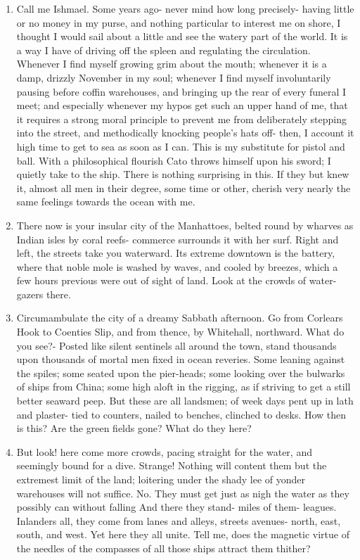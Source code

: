 \documentclass{armymemo}
\begin{document}
\begin{enumerate}
  \begin{enumerate}
  \item Call me Ishmael. Some years ago- never mind how long precisely- having little or
    no money in my purse, and nothing particular to interest me on shore, I thought
    I would sail about a little and see the watery part of the world. It is a way I
    have of driving off the spleen and regulating the circulation. Whenever I find
    myself growing grim about the mouth; whenever it is a damp, drizzly November in
    my soul; whenever I find myself involuntarily pausing before coffin warehouses,
    and bringing up the rear of every funeral I meet; and especially whenever my
    hypos get such an upper hand of me, that it requires a strong moral principle to
    prevent me from deliberately stepping into the street, and methodically knocking
    people's hats off- then, I account it high time to get to sea as soon as I can.
    This is my substitute for pistol and ball. With a philosophical flourish Cato
    throws himself upon his sword; I quietly take to the ship. There is nothing
    surprising in this. If they but knew it, almost all men in their degree, some
    time or other, cherish very nearly the same feelings towards the ocean with me.

  \item There now is your insular city of the Manhattoes, belted round by wharves as
    Indian isles by coral reefs- commerce surrounds it with her surf. Right and
    left, the streets take you waterward. Its extreme downtown is the battery, where
    that noble mole is washed by waves, and cooled by breezes, which a few hours
    previous were out of sight of land. Look at the crowds of water-gazers there.

  \item Circumambulate the city of a dreamy Sabbath afternoon. Go from Corlears Hook to
    Coenties Slip, and from thence, by Whitehall, northward. What do you see?-
    Posted like silent sentinels all around the town, stand thousands upon thousands
    of mortal men fixed in ocean reveries. Some leaning against the spiles; some
    seated upon the pier-heads; some looking over the bulwarks of ships from China;
    some high aloft in the rigging, as if striving to get a still better seaward
    peep. But these are all landsmen; of week days pent up in lath and plaster- tied
    to counters, nailed to benches, clinched to desks. How then is this? Are the
    green fields gone? What do they here?

  \item But look! here come more crowds, pacing straight for the water, and seemingly
    bound for a dive. Strange! Nothing will content them but the extremest limit of
    the land; loitering under the shady lee of yonder warehouses will not suffice.
    No. They must get just as nigh the water as they possibly can without falling
    And there they stand- miles of them- leagues. Inlanders all, they come from
    lanes and alleys, streets avenues- north, east, south, and west. Yet here they
    all unite. Tell me, does the magnetic virtue of the needles of the compasses of
    all those ships attract them thither?


\end{enumerate}
\end{enumerate}
\end{document}
